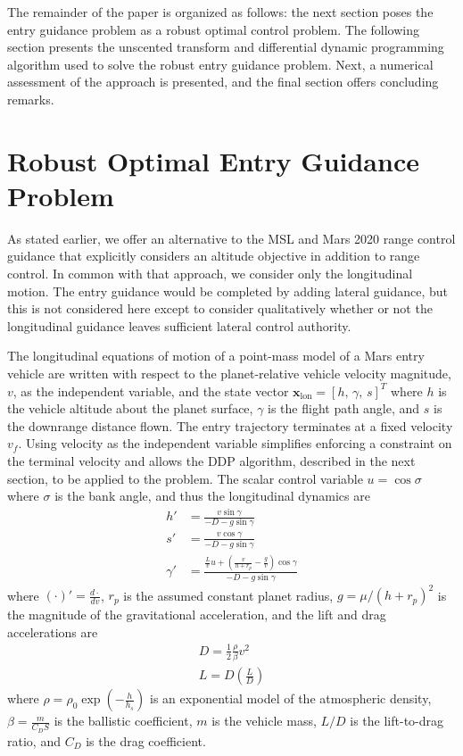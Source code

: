 \documentclass[journal ]{new-aiaa}
\newcommand{\state}{\ensuremath{\mathbf{x}}}
\begin{document}
 
The remainder of the paper is organized as follows: the next section poses the entry guidance problem as a robust optimal control problem. The following section presents the unscented transform and differential dynamic programming algorithm used to solve the robust entry guidance problem. Next, a numerical assessment of the approach is presented, and the final section offers concluding remarks. 

\section*{Robust Optimal Entry Guidance Problem}
As stated earlier, we offer an alternative to the MSL and Mars 2020 range control guidance that explicitly considers an altitude objective in addition to range control. In common with that approach, we consider only the longitudinal motion. The entry guidance would be completed by adding lateral guidance, but this is not considered here except to consider qualitatively whether or not the longitudinal guidance leaves sufficient lateral control authority.

The longitudinal equations of motion of a point-mass model of a Mars entry vehicle are written with respect to the planet-relative vehicle velocity magnitude, $v$, as the independent variable, and the state vector $\state_{\mathrm{lon}}=[h,\,\gamma,\, s]^T$ where $h$ is the vehicle altitude about the planet surface, $\gamma$ is the flight path angle, and $s$ is the downrange distance flown. The entry trajectory terminates at a fixed velocity $v_f$. Using velocity as the independent variable simplifies enforcing a constraint on the terminal velocity and allows the DDP algorithm, described in the next section, to be applied to the problem. The scalar control variable $u=\cos\sigma$ where $\sigma$ is the bank angle, and thus the longitudinal dynamics are
\begin{align}
h' &= \frac{v\sin\gamma}{-D - g\sin\gamma} \label{eq_dynamics_altitude}\\
s' &= \frac{v\cos\gamma}{-D - g\sin\gamma} \\
\gamma' &= \frac{\frac{L}{v}u + \left(\frac{v}{h+r_p}-\frac{g}{v}\right)\cos\gamma}{-D - g\sin\gamma} \label{eq_dynamics_fpa}
\end{align}
where $(\cdot)' = \frac{d\cdot}{dv}$, $r_p$ is the assumed constant planet radius, $g=\mu/(h+r_p)^2$ is the magnitude of the gravitational acceleration, and the lift and drag accelerations are
\begin{align}
D = \frac{1}{2}\frac{\rho}{\beta} v^2 \\
L = D(\frac{L}{D})
\end{align}
where $\rho=\rho_0\exp\left(-\frac{h}{h_s}\right)$ is an exponential model of the atmospheric density, $\beta=\frac{m}{C_DS}$ is the ballistic coefficient, $m$ is the vehicle mass, $L/D$ is the lift-to-drag ratio, and $C_D$ is the drag coefficient.
\end{document}
